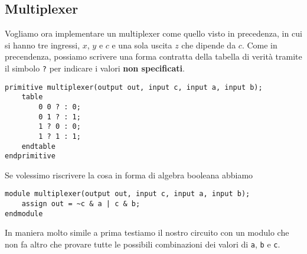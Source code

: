 \subsection{Multiplexer}
Vogliamo ora implementare un multiplexer come quello visto in precedenza, in cui si hanno tre
ingressi, $x$, $y$ e $c$ e una sola uscita $z$ che dipende da $c$. Come in precendenza, possiamo
scrivere una forma contratta della tabella di verità tramite il simbolo \verb|?| per indicare i
valori \textbf{non specificati}.
\begin{verbatim}
primitive multiplexer(output out, input c, input a, input b);
	table
		0 0 ? : 0;
		0 1 ? : 1;
		1 ? 0 : 0;
		1 ? 1 : 1;
	endtable
endprimitive
\end{verbatim}
Se volessimo riscrivere la cosa in forma di algebra booleana abbiamo
\begin{verbatim}
module multiplexer(output out, input c, input a, input b);
	assign out = ~c & a | c & b;
endmodule
\end{verbatim}
In maniera molto simile a prima testiamo il nostro circuito con un modulo che non fa altro che
provare tutte le possibili combinazioni dei valori di \verb|a|, \verb|b| e \verb|c|.

